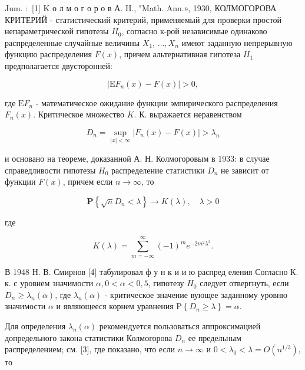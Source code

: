 \documentclass[10pt]{article}
\begin{document}
Jum. $:$ [1] K о л м о г о р о в А. H., "Math. Ann.», 1930, КОЛМОГОРОВА КРИТЕРИЙ - статистический критерий, применяемый для проверки простой непараметрической гипотезы $H_{0}$, согласно к-рой независимые одинаково распределенные случайные величины $X_{1}$, $\ldots, X_{n}$ имеют заданную непрерывную функцию распределения $F(x)$, причем альтернативная гипотеза $H_{1}$ предполагается двусторонней:



\[

\left|\mathrm{E} F_{n}(x)-F(x)\right|>0,

\]



где $\mathrm{E} F_{n}$ - математическое ожидание функции эмпирического распределения $F_{n}(x)$. Критическое множество $K$. К. выражается неравенством



\[

D_{n}=\sup _{|x|<\infty}\left|F_{n}(x)-F(x)\right|>\lambda_{n}

\]



и основано на теореме, доказанной А. Н. Колмогоровым в 1933: в случае справедливости гипотезы $H_{0}$ распределение статистики $D_{n}$ не зависит от функции $F(x)$, причем если $n \rightarrow \infty$, то



\[

\mathbf{P}\left\{\sqrt{n} D_{n}<\lambda\right\} \rightarrow K(\lambda), \quad \lambda>0

\]



где



\[

K(\lambda)=\sum_{m=-\infty}^{\infty}(-1)^{m} e^{-2 m^{2} \lambda^{2}} .

\]



В 1948 Н. В. Смирнов [4] табулировал ф у н к и и ю распред еления Согласно К. к. с уровнем значимости $\alpha, 0<\alpha<0,5$, гипотезу $H_{0}$ следует отвергнуть, если $D_{n} \geqslant \lambda_{n}(\alpha)$, где $\lambda_{n}(\alpha)$ - критическое значение вующее заданному уровню значимости $\alpha$ и являющееся корнем уравнения $\mathrm{P}\left\{D_{n} \geqslant \lambda\right\}=\alpha$.



Для определения $\lambda_{n}(\alpha)$ рекомендуется пользоваться аппроксимацией допредельного закона статистики Колмогорова $D_{n}$ ее предельным распределением; см. [3], где показано, что если $n \rightarrow \infty$ и $0<\lambda_{0}<\lambda=O\left(n^{1 / 3}\right)$, то
\end{document}
